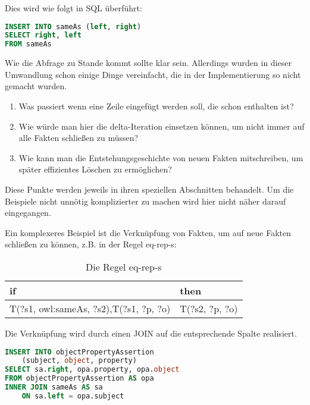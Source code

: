 Dies wird wie folgt in SQL überführt:
\begin{lstlisting}[language=SQL]
INSERT INTO sameAs (left, right)
SELECT right, left
FROM sameAs
\end{lstlisting}

Wie die Abfrage zu Stande kommt sollte klar sein. Allerdings wurden in dieser Umwandlung schon einige Dinge vereinfacht, die in der Implementierung so nicht gemacht wurden.

\begin{enumerate}
  \item Was passiert wenn eine Zeile eingefügt werden soll, die schon enthalten ist?
  \item Wie würde man hier die delta-Iteration einsetzen können, um nicht immer auf alle Fakten schließen zu müssen?
  \item Wie kann man die Entstehungsgeschichte von neuen Fakten mitschreiben, um später effizientes Löschen zu ermöglichen?
\end{enumerate}

Diese Punkte werden jeweils in ihren speziellen Abschnitten behandelt. Um die Beispiele nicht unnötig komplizierter zu machen wird hier nicht näher darauf eingegangen.

Ein komplexeres Beispiel ist die Verknüpfung von Fakten, um auf neue Fakten schließen zu können, z.B. in der Regel eq-rep-s:
\begin{table}[htb]
\begin{center}
	\begin{tabular}{m{4.5cm}|m{4cm}}
	if & then \\ \hline
	T(?s1, owl:sameAs, ?s2),\newline T(?s1, ?p, ?o) & T(?s2, ?p, ?o)
	\end{tabular}
\end{center}
	\caption{Die Regel eq-rep-s}
	\label{rule-eq-rep-s}
\end{table}

Die Verknüpfung wird durch einen JOIN auf die entsprechende Spalte realisiert.

\begin{lstlisting}[language=SQL]
INSERT INTO objectPropertyAssertion 
	(subject, object, property)
SELECT sa.right, opa.property, opa.object
FROM objectPropertyAssertion AS opa
INNER JOIN sameAs AS sa
	ON sa.left = opa.subject
\end{lstlisting}

